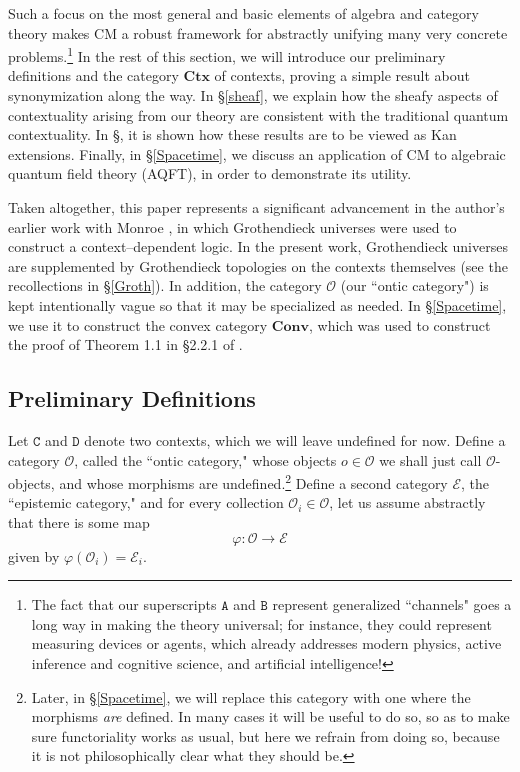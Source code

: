 \documentclass{article}
\numberwithin{tm}{section}
\numberwithin{dn}{section}
\numberwithin{as}{section}
\numberwithin{rk}{section}
\numberwithin{lem}{section}
\numberwithin{ax}{section}
\numberwithin{pp}{section}
\numberwithin{eg}{section}
\numberwithin{war}{section}
\numberwithin{equation}{section}
\numberwithin{prop}{section}
\numberwithin{nt}{section}
\numberwithin{rc}{section}
\def\code#1{\texttt{#1}}
\begin{document}
Such a focus on the most general and basic elements of algebra and category theory makes CM a robust framework for abstractly unifying many very concrete problems.\footnote{The fact that our superscripts $\code{A}$ and $\code{B}$ represent generalized ``channels" goes a long way in making the theory universal; for instance, they could represent measuring devices or agents, which already addresses modern physics, active inference and cognitive science, and artificial intelligence!} In the rest of this section, we will introduce our preliminary definitions and the category $\mathbf{Ctx}$ of contexts, proving a simple result about synonymization along the way. In \S\ref{sheaf}, we explain how the sheafy aspects of contextuality arising from our theory are consistent with the traditional quantum contextuality. In \S\label{kan}, it is shown how these results are to be viewed as Kan extensions. Finally, in \S\ref{Spacetime}, we discuss an application of CM to algebraic quantum field theory (AQFT), in order to demonstrate its utility.

Taken altogether, this paper represents a significant advancement in the author's earlier work with Monroe \cite{buchanan}, in which Grothendieck universes were used to construct a context--dependent logic. In the present work, Grothendieck universes are supplemented by Grothendieck topologies on the contexts themselves (see the recollections in \S\ref{Groth}). In addition, the category $\mathcal{O}$ (our ``ontic category") is kept intentionally vague so that it may be specialized as needed. In \S\ref{Spacetime}, we use it to construct the convex category $\mathbf{Conv}$, which was used to construct the proof of Theorem 1.1 in \S2.2.1 of \cite{buchanan}.

\subsection{Preliminary Definitions} \label{Prelim}
Let $\code{C}$ and $\code{D}$ denote two contexts, which we will leave undefined for now. Define a category $\mathcal{O}$, called the ``ontic category," whose objects $o \in \mathcal{O}$ we shall just call $\mathcal{O}$-objects, and whose morphisms are undefined.\footnote{Later, in \S\ref{Spacetime}, we will replace this category with one where the morphisms \emph{are} defined. In many cases it will be useful to do so, so as to make sure functoriality works as usual, but here we refrain from doing so, because it is not philosophically clear what they should be.} Define a second category $\mathcal{E}$, the ``epistemic category," and for every collection $\mathcal{O}_i \in \mathcal{O}$, let us assume abstractly that there is some map
$$\varphi: \mathcal{O} \longrightarrow \mathcal{E}$$
given by $\varphi(\mathcal{O}_i) = \mathcal{E}_i$.
\end{document}
